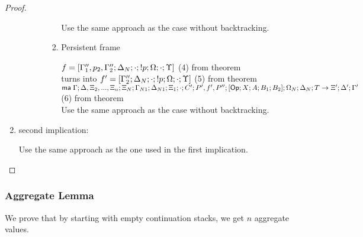 \begin{proof}
\begin{enumerate}
\begin{itemize}
\begin{enumerate}
\begin{enumerate}
               Use the same approach as the case without backtracking.
               
               \item Persistent frame
               
               $f = [\Gamma''_1, p_2, \Gamma''_2; \Delta_N; \cdot; {!} p; \Omega; \cdot; \Upsilon]$ \hfill (4) from theorem \\
               turns into $f' = [\Gamma''_2; \Delta_N; \cdot; {!} p; \Omega; \cdot; \Upsilon]$ \hfill (5) from theorem \\
               $\mathsf{ma} \; \Gamma; \Delta, \Xi_2, ..., \Xi_n; \Xi_N; \Gamma_{N1}; \Delta_{N1}; \Xi_1; \cdot; C'; P', f', P''; [\mathsf{Op} ; X ; A ; B_1; B_2]; \Omega_N; \Delta_N; T \rightarrow \Xi'; \Delta'; \Gamma'$ \hfill (6) from theorem \\
               
               Use the same approach as the case without backtracking.
            \end{enumerate}
         \end{enumerate}
      \end{itemize}
      
      \item second implication:
      
      Use the same approach as the one used in the first implication.
   \end{enumerate}
\end{proof}

\subsubsection{Aggregate Lemma}

We prove that by starting with empty continuation stacks, we get $n$ aggregate values.

